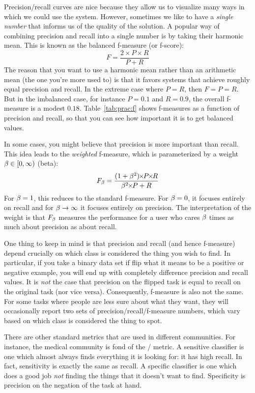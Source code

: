 Precision/recall curves are nice because they allow us to visualize
many ways in which we could use the system.  However, sometimes we
like to have a \emph{single number} that informs us of the quality of
the solution.  A popular way of combining precision and recall into a
single number is by taking their harmonic mean.  This is known as the
balanced f-measure (or f-score):
\begin{equation} \label{eq:f}
F = \frac {2\times P \times R} {P + R}
\end{equation}
The reason that you want to use a harmonic mean rather than an
arithmetic mean (the one you're more used to) is that it favors
systems that achieve roughly equal precision and recall.  In the
extreme case where $P=R$, then $F=P=R$.  But in the imbalanced case,
for instance $P=0.1$ and $R=0.9$, the overall f-measure is a modest
$0.18$.  Table~\ref{tab:prac:f} shows f-measures as a function of
precision and recall, so that you can see how important it is to get
balanced values.

In some cases, you might believe that precision is more important than
recall.  This idea leads to the \emph{weighted} f-measure, which is
parameterized by a weight $\beta \in [0,\infty)$ (beta):
\begin{equation} \label{eq:f-weighted}
F_\be = \frac {(1 + \be^2) \times P \times R} {\be^2 \times P + R}
\end{equation}
For $\beta=1$, this reduces to the standard f-measure.  For $\beta = 0$, it
focuses entirely on recall and for $\beta \rightarrow \infty$ it focuses
entirely on precision.  The interpretation of the weight is that
$F_\beta$ measures the performance for a user who cares $\beta$ times as
much about precision as about recall.

One thing to keep in mind is that precision and recall (and hence
f-measure) depend crucially on which class is considered the thing you
wish to find.  In particular, if you take a binary data set if flip
what it means to be a positive or negative example, you will end up
with completely difference precision and recall values.  It is
\emph{not} the case that precision on the flipped task is equal to
recall on the original task (nor vice versa).  Consequently, f-measure
is also not the same.  For some tasks where people are less sure about
what they want, they will occasionally report two sets of
precision/recall/f-measure numbers, which vary based on which class is
considered the thing to spot.

There are other standard metrics that are used in different
communities.  For instance, the medical community is fond of the
/ metric.  A sensitive
classifier is one which almost always finds everything it is looking
for: it has high recall.  In fact, sensitivity is exactly the same as
recall.  A specific classifier is one which does a good job \emph{not}
finding the things that it doesn't want to find.  Specificity is
precision on the negation of the task at hand.

